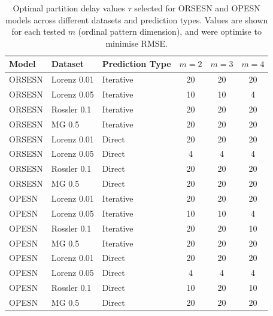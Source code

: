 \begin{table}
    \centering
    \begin{tabular}{lllccc}
        \toprule
        \textbf{Model} & \textbf{Dataset} & \textbf{Prediction Type} & \textbf{$m=2$} & \textbf{$m=3$} & \textbf{$m=4$} \\
        \midrule
        ORSESN & Lorenz 0.01 & Iterative & 20 & 20 & 20 \\
        ORSESN & Lorenz 0.05 & Iterative & 10 & 10 & 4 \\
        ORSESN & Rossler 0.1 & Iterative & 20 & 20 & 20 \\
        ORSESN & MG 0.5 & Iterative & 20 & 20 & 20 \\
        \midrule
        ORSESN & Lorenz 0.01 & Direct & 20 & 20 & 20 \\
        ORSESN & Lorenz 0.05 & Direct & 4 & 4 & 4 \\
        ORSESN & Rossler 0.1 & Direct & 20 & 20 & 20 \\
        ORSESN & MG 0.5 & Direct & 20 & 20 & 20 \\
        \midrule %
        OPESN & Lorenz 0.01 & Iterative & 20 & 20 & 20 \\
        OPESN & Lorenz 0.05 & Iterative & 10 & 10 & 4 \\
        OPESN & Rossler 0.1 & Iterative & 20 & 20 & 10 \\
        OPESN & MG 0.5 & Iterative & 20 & 20 & 20 \\
        \midrule
        OPESN & Lorenz 0.01 & Direct & 20 & 20 & 20 \\
        OPESN & Lorenz 0.05 & Direct & 4 & 4 & 4 \\
        OPESN & Rossler 0.1 & Direct & 10 & 20 & 10 \\
        OPESN & MG 0.5 & Direct & 20 & 20 & 20 \\
        \bottomrule
    \end{tabular}
    \caption{Optimal partition delay values $\tau$ selected for ORSESN and OPESN models across different datasets and prediction types. Values are shown for each tested $m$ (ordinal pattern dimension), and were optimise to minimise RMSE.}
    \label{tab:taus}
\end{table}

